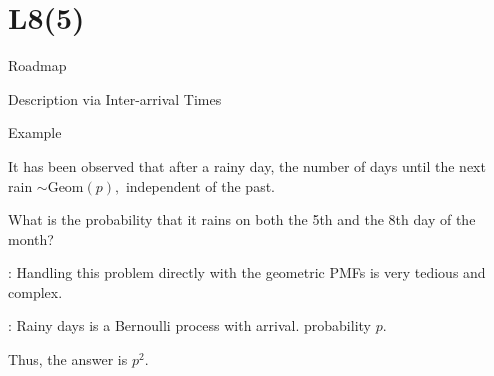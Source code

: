 \section{L8(5)}
\begin{frame}{Roadmap}

\plitemsep 0.2in

\bce[(1)]

\item {}
\item {}

\item {}

\item {}

\item {}

\ece

\end{frame}

\begin{frame}{Description via Inter-arrival Times}


\end{frame}

\begin{frame}{Example}

  \plitemsep 0.1in

  \bci
  
\item It has been observed that after a rainy day, the number of days
  until the next rain $\sim \text{Geom}(p),$ independent of the past. 
  
\item<2-> \question What is the probability that it rains on both the 5th and the
  8th day of the month?

\item<3-> : Handling this problem directly with the geometric
  PMFs is very tedious and complex.

\item<4-> : Rainy days is a  Bernoulli process with arrival.
  probability $p.$

\item<5-> Thus, the answer is $p^2.$

  \eci

\end{frame}

